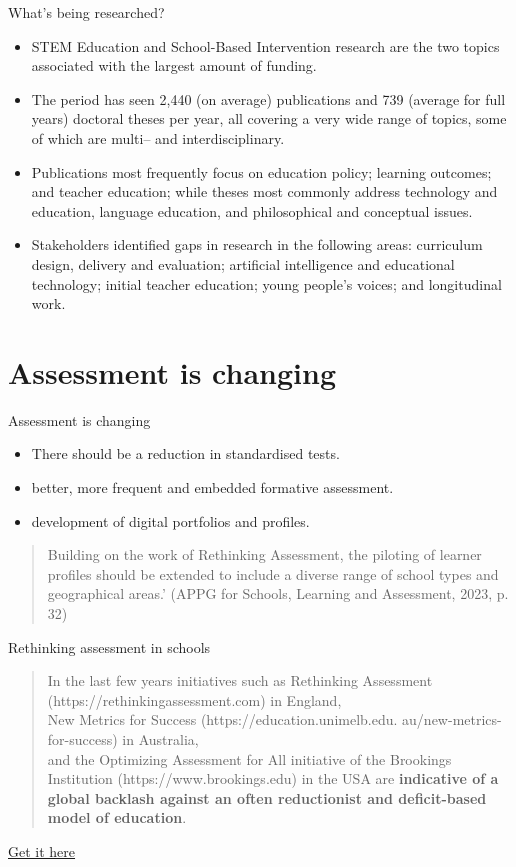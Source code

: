 \documentclass{beamer}					%
\begin{document}
\begin{frame}{What's being researched?}
\begin{itemize}
\item STEM Education and School-Based Intervention research are the two topics associated with the largest amount of funding.
\item The period has seen 2,440 (on average) publications and 739 (average for full years) doctoral theses per year, all covering a very wide range of topics, some of which are multi– and interdisciplinary.
\item Publications most frequently focus on education policy; learning outcomes; and teacher education; while theses most commonly address technology and education, language education, and philosophical and conceptual issues.
\item Stakeholders identified gaps in research in the following areas: curriculum design, delivery and evaluation; artificial intelligence and educational technology; initial teacher education; young people’s
voices; and longitudinal work.
\end{itemize}
\end{frame}

\section{Assessment is changing}
\begin{frame}{Assessment is changing}
    \begin{itemize}
        \item There should be a reduction in standardised tests.
     \item better, more frequent and embedded formative assessment. 
     \item development of digital portfolios and profiles.  
\end{itemize}
\begin{quote}    
Building on the work of Rethinking Assessment, the piloting of learner profiles should be extended to include a diverse range of school types and geographical areas.’ (APPG for Schools, Learning and Assessment, 2023, p. 32)
\end{quote}
\end{frame}
\begin{frame}{Rethinking assessment in schools}
    \begin{quote}
        In the last few years initiatives such as 
Rethinking Assessment (https://rethinkingassessment.com) in England,\\ New Metrics 
for Success (https://education.unimelb.edu.
au/new-metrics-for-success) in Australia,\\ and 
the Optimizing Assessment for All initiative 
of the Brookings Institution (https://www.brookings.edu) in the USA are \textbf{indicative of a global backlash against an often reductionist and deficit-based model of education}.
    \end{quote}\href{https://www.researchgate.net/publication/360806817_Rethinking_assessment_in_schools}{Get it here}
\end{frame}
\end{document}
